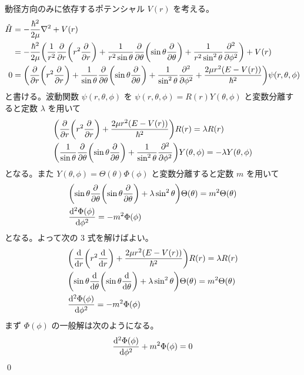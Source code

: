 \documentclass[uplatex,dvipdfmx,a4paper,11pt]{jlreq}
\makeatletter
\theoremstyle{definition}
\renewenvironment{proof}[1][\proofname]{\par
  \normalfont
  \topsep6\p@\@plus6\p@ \trivlist
  \item[\hskip\labelsep{\bfseries #1}\@addpunct{\bfseries}]\ignorespaces\quad\par
}{%
  \qed\endtrivlist\@endpefalse
}
\renewcommand\proofname{証明}
\makeatother
\begin{document}
\begin{proof}
  動径方向のみに依存するポテンシャル $V(r)$ を考える。
  \begin{align}
    \hat{H} & = -\frac{\hbar^2}{2\mu}\laplacian + V(r)                                                                                                                                                       \\
            & = -\frac{\hbar^2}{2\mu}\qty(\frac{1}{r^2}\pdv{r}\qty(r^2\pdv{r}) + \frac{1}{r^2\sin\theta}\pdv{\theta}\qty(\sin\theta\pdv{\theta}) + \frac{1}{r^2\sin^2\theta}\pdv[2]{\phi}) + V(r)            \\
    0       & = \qty(\pdv{r}\qty(r^2\pdv{r}) + \frac{1}{\sin\theta}\pdv{\theta}\qty(\sin\theta\pdv{\theta}) + \frac{1}{\sin^2\theta}\pdv[2]{\phi} + \frac{2\mu r^2(E - V(r))}{\hbar^2})\psi(r, \theta, \phi)
  \end{align}
  と書ける。波動関数 $\psi(r, \theta, \phi)$ を $\psi(r, \theta, \phi) = R(r)Y(\theta, \phi)$ と変数分離すると定数 $\lambda$ を用いて
  \begin{align}
     & \qty(\pdv{r}\qty(r^2\pdv{r}) + \frac{2\mu r^2(E - V(r))}{\hbar^2})R(r) = \lambda R(r)                                                               \\
     & \qty(\frac{1}{\sin\theta}\pdv{\theta}\qty(\sin\theta\pdv{\theta}) + \frac{1}{\sin^2\theta}\pdv[2]{\phi}) Y(\theta, \phi) = -\lambda Y(\theta, \phi)
  \end{align}
  となる。また $Y(\theta, \phi) = \Theta(\theta)\Phi(\phi)$ と変数分離すると定数 $m$ を用いて
  \begin{align}
     & \qty(\sin\theta\pdv{\theta}\qty(\sin\theta\pdv{\theta}) + \lambda \sin^2\theta)\Theta(\theta) = m^2\Theta(\theta) \\
     & \dv[2]{\Phi(\phi)}{\phi} = -m^2\Phi(\phi)
  \end{align}
  となる。よって次の 3 式を解けばよい。
  \begin{align}
     & \qty(\dv{r}\qty(r^2\dv{r}) + \frac{2\mu r^2(E - V(r))}{\hbar^2})R(r) = \lambda R(r)                              \\
     & \qty(\sin\theta\dv{\theta}\qty(\sin\theta\dv{\theta}) + \lambda \sin^2\theta)\Theta(\theta)  = m^2\Theta(\theta) \\
     & \dv[2]{\Phi(\phi)}{\phi} = -m^2\Phi(\phi)
  \end{align}
  まず $\Phi(\phi)$ の一般解は次のようになる。
  \begin{align}
     & \dv[2]{\Phi(\phi)}{\phi} + m^2\Phi(\phi) = 0               \\

\end{align}
\end{proof}
\end{document}
